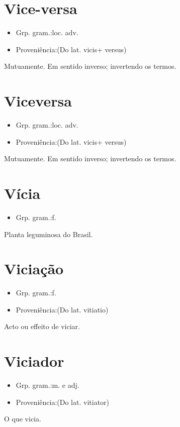 \documentclass{article}
\begin{document}
\section{Vice-versa}
\begin{itemize}
\item {Grp. gram.:loc. adv.}
\end{itemize}
\begin{itemize}
\item {Proveniência:(Do lat. \textunderscore vicis\textunderscore  + \textunderscore versus\textunderscore )}
\end{itemize}
Mutuamente.
Em sentido inverso; invertendo os termos.
\section{Viceversa}
\begin{itemize}
\item {Grp. gram.:loc. adv.}
\end{itemize}
\begin{itemize}
\item {Proveniência:(Do lat. \textunderscore vicis\textunderscore  + \textunderscore versus\textunderscore )}
\end{itemize}
Mutuamente.
Em sentido inverso; invertendo os termos.
\section{Vícia}
\begin{itemize}
\item {Grp. gram.:f.}
\end{itemize}
Planta leguminosa do Brasil.
\section{Viciação}
\begin{itemize}
\item {Grp. gram.:f.}
\end{itemize}
\begin{itemize}
\item {Proveniência:(Do lat. \textunderscore vitiatio\textunderscore )}
\end{itemize}
Acto ou effeito de viciar.
\section{Viciador}
\begin{itemize}
\item {Grp. gram.:m.  e  adj.}
\end{itemize}
\begin{itemize}
\item {Proveniência:(Do lat. \textunderscore vitiator\textunderscore )}
\end{itemize}
O que vicia.
\end{document}
